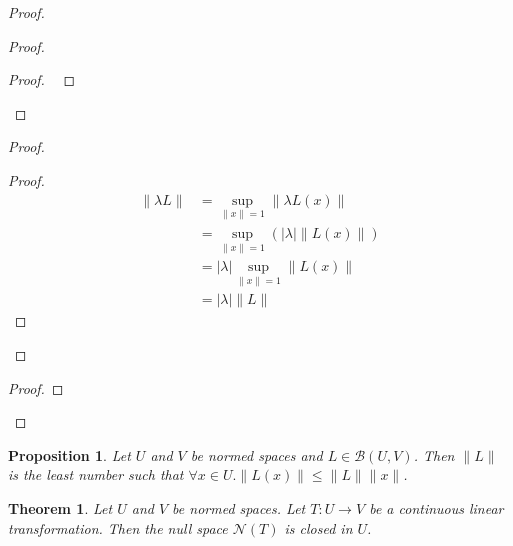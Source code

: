 \documentclass{book}
\let\qed\relax
\newtheorem{prop}[ax]{Proposition}
\newtheorem{thm}[ax]{Theorem}
\theoremstyle{definition}
\begin{document}
\begin{proof}
\pf
{}
\begin{proof}
	\begin{proof}
		\pf\ 
	\end{proof}
\end{proof}
\begin{proof}
	\begin{proof}
		\pf
		\begin{align*}
			\| \lambda L \| & = \sup_{\|x\| = 1} \| \lambda L(x) \| \\
			& = \sup_{\|x\| = 1} (|\lambda| \|L(x)\|) \\
			& = |\lambda| \sup_{\|x\| = 1} \|L(x)\| \\
			& = |\lambda| \|L\|
		\end{align*}
	\end{proof}
\end{proof}
\begin{proof}
\end{proof}
\qed
\end{proof}

\begin{prop}
Let $U$ and $V$ be normed spaces and $L \in \mathcal{B}(U,V)$. Then $\|L\|$ is the least number such that $\forall x \in U. \| L(x) \| \leq \| L \| \| x \|$.
\end{prop}

\begin{thm}
Let $U$ and $V$ be normed spaces. Let $T : U \rightarrow V$ be a continuous linear transformation. Then the null space $\mathcal{N}(T)$ is closed in $U$.
\end{thm}
\end{document}
